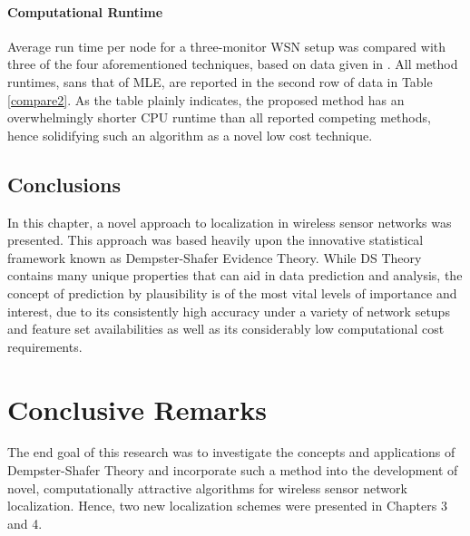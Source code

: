 \documentclass[12pt]{uthesis-v12}  %
\begin{document}
\subsubsection{Computational Runtime}

Average run time per node for a three-monitor WSN setup was compared with three of the four aforementioned techniques, based on data given in \cite{yao}. All method runtimes, sans that of MLE, are reported in the second row of data in Table \ref{compare2}. As the table plainly indicates, the proposed method has an overwhelmingly shorter CPU runtime than all reported competing methods, hence solidifying such an algorithm as a novel low cost technique.

\section{Conclusions}

In this chapter, a novel approach to localization in wireless sensor networks was presented. This approach was based heavily upon the innovative statistical framework known as Dempster-Shafer Evidence Theory. While DS Theory contains many unique properties that can aid in data prediction and analysis, the concept of prediction by plausibility is of the most vital levels of importance and interest, due to its consistently high accuracy under a variety of network setups and feature set availabilities as well as its considerably low computational cost requirements.


\chapter{Conclusive Remarks}

The end goal of this research was to investigate the concepts and applications of Dempster-Shafer Theory and incorporate such a method into the development of novel, computationally attractive algorithms for wireless sensor network localization. Hence, two new localization schemes were presented in Chapters 3 and 4. 
\end{document}

